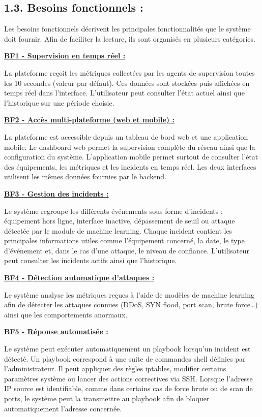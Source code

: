 \documentclass[12pt,a4paper]{report}
\newcommand{\ub}[1]{\uline{\textbf{#1}}}
\begin{document}
\subsection*{1.3. Besoins fonctionnels :}
Les besoins fonctionnels décrivent les principales fonctionnalités que le système doit fournir. Afin de faciliter la lecture, ils sont organisés en plusieurs catégories.\par
\ub{BF1 - Supervision en temps réel :}\par
La plateforme reçoit les métriques collectées par les agents de supervision toutes les 10 secondes (valeur par défaut). Ces données sont stockées puis affichées en temps réel dans l’interface. L’utilisateur peut consulter l’état actuel ainsi que l’historique sur une période choisie.\par
\ub{BF2 - Accès multi-plateforme (web et mobile) :}\par
La plateforme est accessible depuis un tableau de bord web et une application mobile. Le dashboard web permet la supervision complète du réseau ainsi que la configuration du système. L’application mobile permet surtout de consulter l’état des équipements, les métriques et les incidents en temps réel. Les deux interfaces utilisent les mêmes données fournies par le backend.\par
\ub{BF3 - Gestion des incidents :}\par
Le système regroupe les différents événements sous forme d’incidents : équipement hors ligne, interface inactive, dépassement de seuil ou attaque détectée par le module de machine learning. Chaque incident contient les principales informations utiles comme l’équipement concerné, la date, le type d’événement et, dans le cas d’une attaque, le niveau de confiance. L’utilisateur peut consulter les incidents actifs ainsi que l’historique.\par
\ub{BF4 - Détection automatique d'attaques :}\par
Le système analyse les métriques reçues à l’aide de modèles de machine learning afin de détecter les attaques connues (DDoS, SYN flood, port scan, brute force…) ainsi que les comportements anormaux.\par
\ub{BF5 - Réponse automatisée :}\par
Le système peut exécuter automatiquement un playbook lorsqu’un incident est détecté. Un playbook correspond à une suite de commandes shell définies par l’administrateur. Il peut appliquer des règles iptables, modifier certains paramètres système ou lancer des actions correctives via SSH. Lorsque l’adresse IP source est identifiable, comme dans certains cas de force brute ou de scan de ports, le système peut la transmettre au playbook afin de bloquer automatiquement l’adresse concernée.\par
\end{document}
